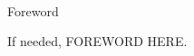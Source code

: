 
\renewcommand{\baselinestretch}{2}
\small\normalsize
\hbox{\ }
 
\vspace{.5in}

\begin{center}
\large{Foreword} 
\end{center} 

If needed, FOREWORD HERE.

